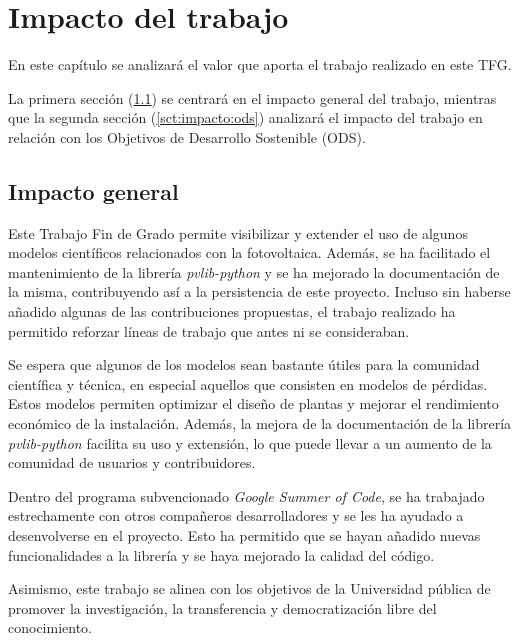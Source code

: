 \chapter{Impacto del trabajo} \label{chp:impacto}

En este capítulo se analizará el valor que aporta el trabajo realizado en este TFG.

La primera sección (\ref{sct:impacto:general}) se centrará en el impacto general del trabajo, mientras que la segunda sección (\ref{sct:impacto:ods}) analizará el impacto del trabajo en relación con los Objetivos de Desarrollo Sostenible (ODS).


\section{Impacto general} \label{sct:impacto:general}

Este Trabajo Fin de Grado permite visibilizar y extender el uso de algunos modelos científicos relacionados con la fotovoltaica. Además, se ha facilitado el mantenimiento de la librería \textit{pvlib-python} y se ha mejorado la documentación de la misma, contribuyendo así a la persistencia de este proyecto. Incluso sin haberse añadido algunas de las contribuciones propuestas, el trabajo realizado ha permitido reforzar líneas de trabajo que antes ni se consideraban.

Se espera que algunos de los modelos sean bastante útiles para la comunidad científica y técnica, en especial aquellos que consisten en modelos de pérdidas. Estos modelos permiten optimizar el diseño de plantas y mejorar el rendimiento económico de la instalación. Además, la mejora de la documentación de la librería \textit{pvlib-python} facilita su uso y extensión, lo que puede llevar a un aumento de la comunidad de usuarios y contribuidores.

Dentro del programa subvencionado \textit{Google Summer of Code}, se ha trabajado estrechamente con otros compañeros desarrolladores y se les ha ayudado a desenvolverse en el proyecto. Esto ha permitido que se hayan añadido nuevas funcionalidades a la librería y se haya mejorado la calidad del código.

Asimismo, este trabajo se alinea con los objetivos de la Universidad pública de promover la investigación, la transferencia y democratización libre del conocimiento.

